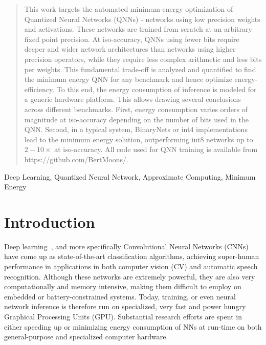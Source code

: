 \documentclass[article,10pt]{IEEEtran}
\begin{document}




\maketitle
\begin{abstract}
This work targets the automated minimum-energy optimization of Quantized Neural Networks (QNNs) - networks using low precision weights and activations. These networks are trained from scratch at an arbitrary fixed point precision. At iso-accuracy, QNNs using fewer bits require deeper and wider network architectures than networks using higher precision operators, while they require less complex arithmetic and less bits per weights. This fundamental trade-off is analyzed and quantified to find the minimum energy QNN for any benchmark and hence optimize energy-efficiency.
To this end, the energy consumption of inference is modeled for a generic hardware platform. This allows drawing several conclusions across different benchmarks. First, energy consumption varies orders of magnitude at iso-accuracy depending on the number of bits used in the QNN. Second, in a typical system, BinaryNets or int4 implementations lead to the minimum energy solution, outperforming int8 networks up to $2-10\times$ at iso-accuracy. All code used for QNN training is available from https://github.com/BertMoons/.
\end{abstract}

\begin{IEEEkeywords}
Deep Learning, Quantized Neural Network, Approximate Computing, Minimum Energy
\end{IEEEkeywords}




%
\IEEEpeerreviewmaketitle

\section{Introduction}
\label{sec:introduction}
Deep learning~\cite{lecun2015deep}, and more specifically Convolutional Neural Networks (CNNs) have come up as state-of-the-art classification algorithms, achieving super-human performance in applications in both computer vision (CV) and automatic speech recognition. 
Although these networks are extremely powerful, they are also very computationally and memory intensive, making them difficult to employ on embedded or battery-constrained systems. Today, training, or even neural network inference is therefore run on specialized, very fast and power hungry Graphical Processing Units (GPU). Substantial research efforts are spent in either speeding up or minimizing energy consumption of NNs at run-time on both general-purpose and specialized computer hardware. 
\end{document}
